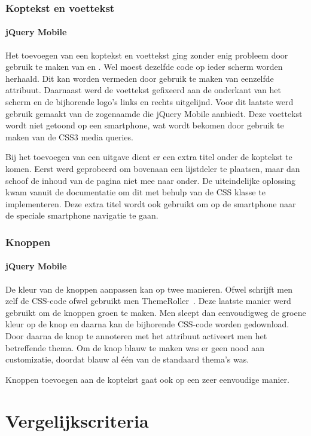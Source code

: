 \subsubsection{Koptekst en voettekst}

\paragraph{jQuery Mobile}
Het toevoegen van een koptekst en voettekst ging zonder enig probleem door gebruik te maken van  en . Wel moest dezelfde code op ieder scherm worden herhaald. Dit kan worden vermeden door gebruik te maken van eenzelfde  attribuut. Daarnaast werd de voettekst gefixeerd aan de onderkant van het scherm en de bijhorende logo's links en rechts uitgelijnd. Voor dit laatste werd gebruik gemaakt van de zogenaamde  die jQuery Mobile aanbiedt. Deze voettekst wordt niet getoond op een smartphone, wat wordt bekomen door gebruik te maken van de CSS3 media queries.

Bij het toevoegen van een uitgave dient er een extra titel onder de koptekst te komen. Eerst werd geprobeerd om bovenaan een lijstdeler te plaatsen, maar dan schoof de inhoud van de pagina niet mee naar onder. De uiteindelijke oplossing kwam vanuit de documentatie \cite{JQuery2013b} om dit met behulp van de  CSS klasse te implementeren. Deze extra titel wordt ook gebruikt om op de smartphone naar de speciale smartphone navigatie te gaan.

\subsubsection{Knoppen}

\paragraph{jQuery Mobile} 
De kleur van de knoppen aanpassen kan op twee manieren. Ofwel schrijft men zelf de CSS-code ofwel gebruikt men ThemeRoller~\cite{JQuery2012c}. Deze laatste manier werd gebruikt om de knoppen groen te maken. Men sleept dan eenvoudigweg de groene kleur op de knop en daarna kan de bijhorende CSS-code worden gedownload. Door daarna de knop te annoteren met het  attribuut activeert men het betreffende thema. Om de knop blauw te maken was er geen nood aan customizatie, doordat blauw al één van de standaard thema's was.

Knoppen toevoegen aan de koptekst gaat ook op een zeer eenvoudige manier.


\section{Vergelijkscriteria}
\label{sec:evaluatie-criteria}